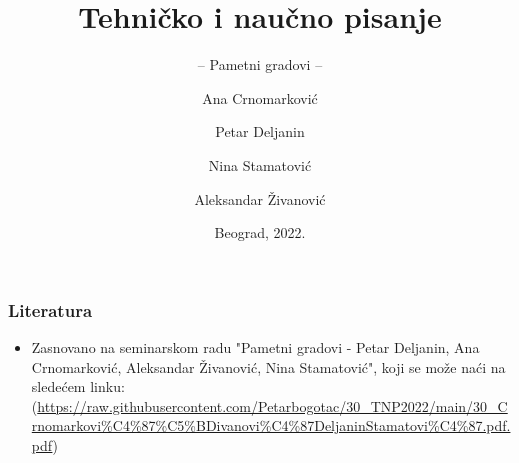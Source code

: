 \documentclass{beamer}
\title{Tehničko i naučno pisanje}
\subtitle{-- Pametni gradovi --}
\author{Ana Crnomarković \and Petar Deljanin\\ \and Nina Stamatović \and Aleksandar Živanović}
\institute{Matematički fakultet\\Univerzitet u Beogradu}
\date{
	\footnotesize{Beograd, 2022.}	
}
\begin{document}
\begin{frame}
	\thispagestyle{empty}
	\titlepage
\end{frame}

\addtocounter{framenumber}{-1}

\begin{frame}[fragile]\frametitle{Literatura}
	\begin{itemize}
		\item Zasnovano na seminarskom radu "Pametni gradovi - Petar Deljanin, Ana Crnomarković, Aleksandar Živanović, Nina Stamatović", koji se može naći na sledećem linku:
		(\url{https://raw.githubusercontent.com/Petarbogotac/30_TNP2022/main/30_Crnomarkovi%C4%87%C5%BDivanovi%C4%87DeljaninStamatovi%C4%87.pdf.pdf})
	\end{itemize}
\end{frame}
\end{document}
